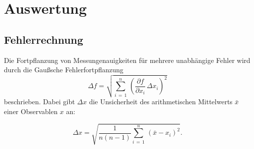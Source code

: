 \newpage 
\section{Auswertung}

        \subsection{Fehlerrechnung}
        \noindent
        Die Fortpflanzung von Messungenauigkeiten für mehrere unabhängige Fehler wird durch die Gaußsche Fehlerfortpflanzung
        \begin{equation*}
        \Delta f = \sqrt{\sum_{i \, = \, 1}^{n} \, \left(\frac{\partial f}{\partial x_i} \, \Delta x_i\right)^2}
        \label{fehler}
        \end{equation*}
        beschrieben. Dabei gibt $\Delta x$ die Unsicherheit des arithmetischen Mittelwerts $\bar{x}$ einer Observablen $x$ an:
        
        \begin{equation*}
        \Delta x =  \sqrt{\frac{1}{n(n-1)} \sum_{i \, = \, 1}^{n} \, \left(\bar{x}- x_i\right)^2}.
        \end{equation*}


